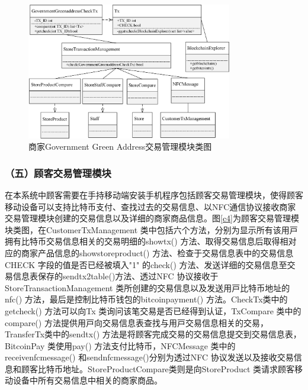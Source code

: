 	

	\begin{figure}[!htbp]
		\centering
		\includegraphics[width = 0.8\textwidth]{c7.jpg}
		\caption{商家Government Green Address交易管理模块类图}\label{c7}
	\end{figure}



\subsubsection{（五）顾客交易管理模块}
在本系统中顾客需要在手持移动端安装手机程序包括顾客交易管理模块，使得顾客移动设备可以支持比特币支付、查找过去的交易信息、以NFC通信协议接收商家交易管理模块创建的交易信息以及详细的商家商品信息。图\ref{c4}为顾客交易管理模块类图，在CustomerTxManagement 类中包括六个⽅法，分别为显⽰所有该⽤⼾拥有⽐特币交易信息相关的交易明细的showtx() ⽅法、取得交易信息后取得相对应的商家产品信息的showstoreproduct() ⽅法、检查于交易信息表中的交易信息CHECK 字段的值是否已经被填⼊"1" 的check() ⽅法、发送详细的交易信息⾄交易信息表保存的sendtx2table()⽅法、透过NFC 协议接收于StoreTransactionManagement 类所创建的交易信息以及发送⽤⼾⽐特币地址的nfc() ⽅法，最后是控制⽐特币钱包的bitcoinpayment() ⽅法。CheckTx类中的getcheck() ⽅法可以向Tx 类询问该笔交易是否已经得到认证，TxCompare 类中的compare() ⽅法提供⽤⼾向交易信息表查找与⽤⼾交易信息相关的交易，TransferTx类中的sendtx() ⽅法是将顾客完成交易的交易信息提交到交易信息表，BitcoinPay 类使⽤pay() ⽅法⽀付⽐特币，NFCMessage 类中的receivenfcmessage() 和sendnfcmessage()分别为透过NFC 协议发送以及接收交易信息和顾客⽐特币地址。StoreProductCompare类则是向StoreProduct 类请求顾客移动设备中所有交易信息中相关的商家商品。

